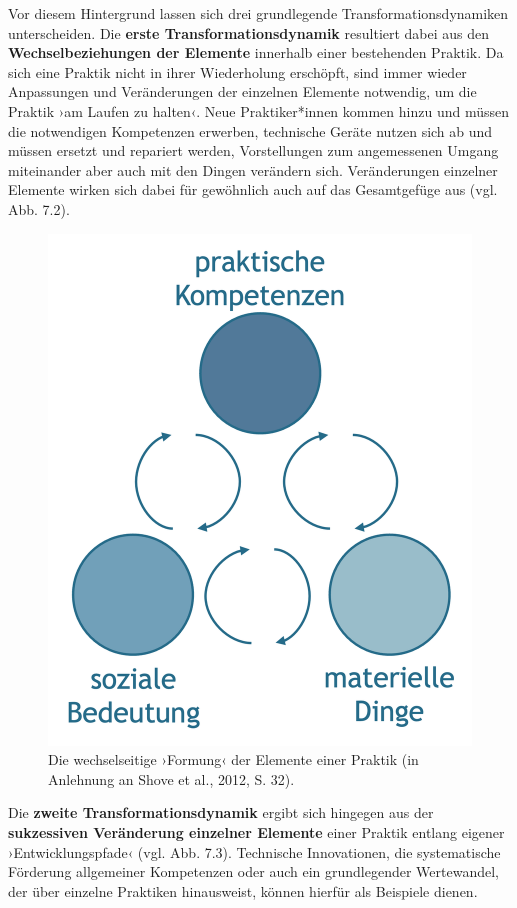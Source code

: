 \documentclass[
  a4paper,
]{book}
\begin{document}
Vor diesem Hintergrund lassen sich drei grundlegende Transformationsdynamiken unterscheiden. Die \textbf{erste Transformationsdynamik} resultiert dabei aus den \textbf{Wechselbeziehungen der Elemente} innerhalb einer bestehenden Praktik. Da sich eine Praktik nicht in ihrer Wiederholung erschöpft, sind immer wieder Anpassungen und Veränderungen der einzelnen Elemente notwendig, um die Praktik ›am Laufen zu halten‹. Neue Praktiker*innen kommen hinzu und müssen die notwendigen Kompetenzen erwerben, technische Geräte nutzen sich ab und müssen ersetzt und repariert werden, Vorstellungen zum angemessenen Umgang miteinander aber auch mit den Dingen verändern sich. Veränderungen einzelner Elemente wirken sich dabei für gewöhnlich auch auf das Gesamtgefüge aus (vgl. {Abb. 7.2}).

\begin{figure}

{\centering \includegraphics[width=0.5\linewidth]{Figures/07-02-Formung-Elemente} 

}

\caption{Die wechselseitige ›Formung‹ der Elemente einer Praktik (in Anlehnung an Shove et al., 2012, S. 32).}\label{fig:fig5}
\end{figure}

Die \textbf{zweite Transformationsdynamik} ergibt sich hingegen aus der \textbf{sukzessiven Veränderung einzelner Elemente} einer Praktik entlang eigener ›Entwicklungspfade‹ (vgl. {Abb. 7.3}). Technische Innovationen, die systematische Förderung allgemeiner Kompetenzen oder auch ein grundlegender Wertewandel, der über einzelne Praktiken hinausweist, können hierfür als Beispiele dienen.
\end{document}
